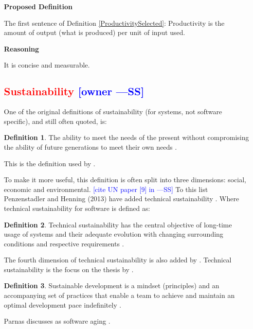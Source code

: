 \documentclass[letterpaper,cleveref]{lipics-v2019}
\newcommand{\authornote}[3]{\textcolor{#1}{[#3 ---#2]}}
\newcommand{\authornote}[3]{}
\newcommand{\wss}[1]{\authornote{blue}{SS}{#1}} %
\newcommand{\notdone}[1]{\textcolor{red}{#1}}
\theoremstyle{definition}
\newtheorem{defn}{Definition}
\begin{document}
\noindent \textbf{Proposed Definition} 

The first sentence of Definition \ref{ProductivitySelected}: Productivity is the
amount of output (what is produced) per unit of input used.

\noindent \textbf{Reasoning}

It is concise and measurable.

\subsection{\notdone{Sustainability} \wss{owner}}

One of the original definitions of sustainability (for systems, not software
specific), and still often quoted, is:

\begin{defn}
\noindent The ability to meet the needs of the present without compromising the ability of
future generations to meet their own needs \citep{Brundtland1987}.
\end{defn}

This is the definition used by \citet{IISD2019}.

To make it more useful, this definition is often split into three dimensions:
social, economic and environmental. \wss{cite UN paper [9] in
  \citet{PenzenstadlerAndHenning2013}}  To this list Penzenstadler and Henning
(2013) have added technical sustainability \citep{PenzenstadlerAndHenning2013}.
Where technical sustainability for software is defined as:

\begin{defn}
\noindent Technical sustainability has the central objective of long-time
usage of systems and their adequate evolution with changing surrounding
conditions and respective requirements \citep{PenzenstadlerAndHenning2013}.
\end{defn}

The fourth dimension of technical sustainability is also added
by \citep{WolframEtAl2017}.  Technical sustainability is the focus on the thesis
by \citet{Hygerth2016}.

\begin{defn}
  \noindent Sustainable development is a mindset (principles) and an
  accompanying set of practices that enable a team to achieve and maintain an
  optimal development pace indefinitely \citep{Tate2005}.
\end{defn}

Parnas discusses as software aging \citep{Parnas1994a}.
\end{document}
